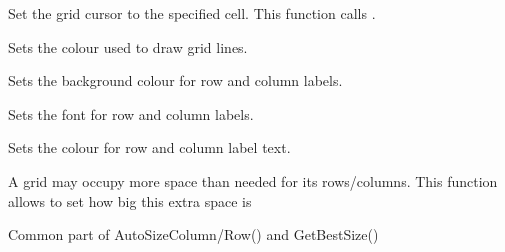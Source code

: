 \label{wxgridsetgridcursor}


Set the grid cursor to the specified cell.
This function calls .



\label{wxgridsetgridlinecolour}


Sets the colour used to draw grid lines.



\label{wxgridsetlabelbackgroundcolour}


Sets the background colour for row and column labels.



\label{wxgridsetlabelfont}


Sets the font for row and column labels.



\label{wxgridsetlabeltextcolour}


Sets the colour for row and column label text.



\label{wxgridsetmargins}


A grid may occupy more space than needed for its rows/columns. This
function allows to set how big this extra space is



\label{wxgridsetorcalccolumnsizes}


Common part of AutoSizeColumn/Row() and GetBestSize()



